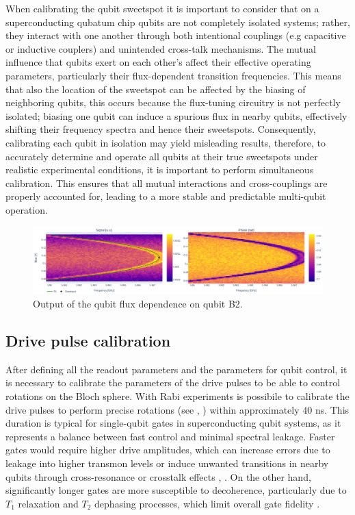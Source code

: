 When calibrating the qubit sweetspot it is important to consider that on a superconducting qubatum chip qubits are not completely isolated systems; rather, they interact with one another through both intentional couplings (e.g capacitive or inductive couplers) and unintended cross-talk mechanisms. 
The mutual influence that qubits exert on each other's affect their effective operating parameters, particularly their flux-dependent transition frequencies.
This means that also the location of the sweetspot can be affected by the biasing of neighboring qubits, this occurs because the flux-tuning circuitry is not perfectly isolated; biasing one qubit can induce a spurious flux in nearby qubits, effectively shifting their frequency spectra and hence their sweetspots.
Consequently, calibrating each qubit in isolation may yield misleading results, therefore, to accurately determine and operate all qubits at their true sweetspots under realistic experimental conditions, it is important to perform simultaneous calibration. 
This ensures that all mutual interactions and cross-couplings are properly accounted for, leading to a more stable and predictable multi-qubit operation.

\begin{figure}[h!]
    \centering
    \includegraphics[width=\textwidth]{figures/png/qubit_flux.png}
    \caption{Output of the qubit flux dependence on qubit B2.}
    \label{fig:qubit_flux}
\end{figure}

\subsection{Drive pulse calibration}

After defining all the readout parameters and the parameters for qubit control, it is necessary to calibrate the parameters of the drive pulses to be able to control rotations on the Bloch sphere.
With Rabi experiments is possibile to calibrate the drive pulses to perform precise rotations (see \cite{Rabi1936}, \cite{Wallraff2005}) within approximately $40$ ns.
This duration is typical for single-qubit gates in superconducting qubit systems, as it represents a balance between fast control and minimal spectral leakage. 
Faster gates would require higher drive amplitudes, which can increase errors due to leakage into higher transmon levels or induce unwanted transitions in nearby qubits through cross-resonance or crosstalk effects \cite{TransmonPaper}, \cite{Motzoi_2009}. 
On the other hand, significantly longer gates are more susceptible to decoherence, particularly due to $T_1$ relaxation and $T_2$ dephasing processes, which limit overall gate fidelity \cite{Barends2014-pb}.

